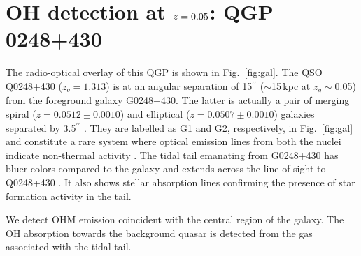 \documentclass[iop,apjl,numberedappendix,appendixfloats,twocolappendix,revtex4]{emulateapj}
\newcommand{\hi}{\mbox{H\,{\sc i}}}
\begin{document}
 


\section{OH detection at $\lowercase{z}=0.05$: QGP\,0248+430}    
\label{sec:OH}  

The radio-optical overlay of this QGP is shown in Fig.~\ref{fig:gal}. 
The QSO Q0248+430 ($z_q=1.313$) is at an angular separation of 15$^{\prime\prime}$ ($\sim$15\,kpc at $z_g\sim$0.05) from the foreground galaxy G0248+430.  
The latter is actually a pair of merging 
spiral ($z = 0.0512 \pm 0.0010$) and  elliptical ($z = 0.0507 \pm 0.0010$) galaxies separated by 3.5$^{\prime\prime}$ 
\citep[3.5\,kpc;][]{Kollatschny91}.  They are 
labelled as G1 and G2, respectively, in Fig.~\ref{fig:gal} and  
constitute a rare system where optical emission lines from both the nuclei indicate non-thermal activity   \citep[][]{Borgeest91}.  
The tidal tail emanating from G0248+430 has bluer colors compared to the galaxy and extends across the line of sight to Q0248+430 
\citep[see Fig.~\ref{fig:gal};][]{Borgeest91}.  It also shows stellar absorption lines confirming the presence of star formation 
activity in the tail. 

We detect OHM emission coincident with the central region of the galaxy. The OH absorption towards the background quasar  is detected from 
the gas associated with the tidal tail.   
\end{document}
